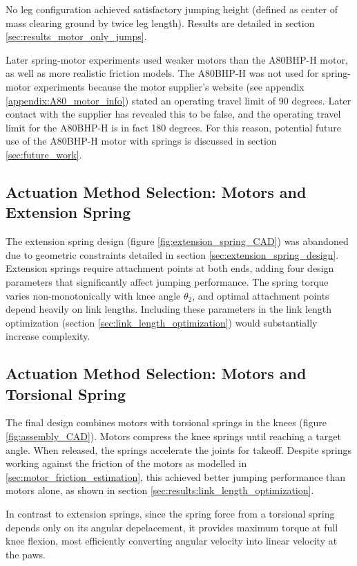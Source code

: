 No leg configuration achieved satisfactory jumping height (defined as center of mass clearing ground by twice leg length). Results are detailed in section \ref{sec:results_motor_only_jumps}.

Later spring-motor experiments used weaker motors than the A80BHP-H motor, as well as more realistic friction models. The A80BHP-H was not used for spring-motor experiments because the motor supplier's website (see appendix \ref{appendix:A80_motor_info}) stated an operating travel limit of 90 degrees. Later contact with the supplier has revealed this to be false, and the operating travel limit for the A80BHP-H is in fact 180 degrees. For this reason, potential future use of the A80BHP-H motor with springs is discussed in section \ref{sec:future_work}.


\subsection{Actuation Method Selection: Motors and Extension Spring}

The extension spring design (figure \ref{fig:extension_spring_CAD}) was abandoned due to geometric constraints detailed in section \ref{sec:extension_spring_design}. Extension springs require attachment points at both ends, adding four design parameters that significantly affect jumping performance. The spring torque varies non-monotonically with knee angle $\theta_2$, and optimal attachment points depend heavily on link lengths. Including these parameters in the link length optimization (section \ref{sec:link_length_optimization}) would substantially increase complexity. 


\subsection{Actuation Method Selection: Motors and Torsional Spring}

The final design combines motors with torsional springs in the knees (figure \ref{fig:assembly_CAD}). Motors compress the knee springs until reaching a target angle. When released, the springs accelerate the joints for takeoff. Despite springs working against the friction of the motors as modelled in \ref{sec:motor_friction_estimation}, this achieved better jumping performance than motors alone, as shown in section \ref{sec:results:link_length_optimization}. 

In contrast to extension springs, since the spring force from a torsional spring depends only on its angular depelacement, it provides maximum torque at full knee flexion, most efficiently converting angular velocity into linear velocity at the paws.


